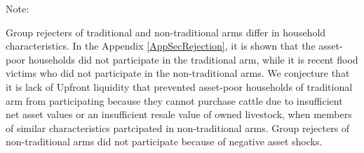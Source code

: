 \begin{table}
\hfil{\footnotesize Note:} 
\end{table}


	Group rejecters of \textsf{traditional} and non-\textsf{traditional} arms differ in household characteristics. In the Appendix \ref{AppSecRejection}, it is shown that the asset-poor households did not participate in the \textsf{traditional} arm, while it is recent flood victims who did not participate in the non-\textsf{traditional} arms. We conjecture that it is lack of \textsf{Upfront} liquidity that prevented asset-poor households of \textsf{traditional} arm from participating because they cannot purchase cattle due to insufficient net asset values or an insufficient resale value of owned livestock, when members of similar characteristics partcipated in non-\textsf{traditional} arms. Group rejecters of non-\textsf{traditional} arms did not participate because of negative asset shocks. %

